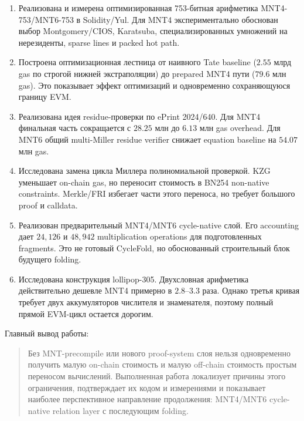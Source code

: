 \documentclass[12pt,a4paper]{article}
\begin{document}
\begin{enumerate}
    \item Реализована и измерена оптимизированная 753-битная арифметика
    MNT4-753/MNT6-753 в Solidity/Yul. Для MNT4 экспериментально обоснован выбор
    Montgomery/CIOS, Karatsuba, специализированных умножений на нерезиденты,
    sparse lines и packed hot path.

    \item Построена оптимизационная лестница от наивного Tate baseline
    ($2.55$ млрд gas по строгой нижней экстраполяции) до prepared MNT4 пути
    ($79.6$ млн gas). Это показывает эффект оптимизаций и одновременно
    сохраняющуюся границу EVM.

    \item Реализована идея residue-проверки по ePrint 2024/640. Для MNT4
    финальная часть сокращается с $28.25$ млн до $6.13$ млн gas overhead.
    Для MNT6 общий multi-Miller residue verifier снижает equation baseline на
    $54.07$ млн gas.

    \item Исследована замена цикла Миллера полиномиальной проверкой. KZG
    уменьшает on-chain gas, но переносит стоимость в BN254 non-native
    constraints. Merkle/FRI избегает части этого переноса, но требует большого
    proof и calldata.

    \item Реализован предварительный MNT4/MNT6 cycle-native слой. Его
    accounting дает $24{,}126$ и $48{,}942$ multiplication operations для
    подготовленных fragments. Это не готовый CycleFold, но обоснованный
    строительный блок будущего folding.

    \item Исследована конструкция lollipop-305. Двухсловная арифметика
    действительно дешевле MNT4 примерно в $2.8$--$3.3$ раза. Однако третья
    кривая требует двух аккумуляторов числителя и знаменателя, поэтому полный
    прямой EVM-цикл остается дорогим.
\end{enumerate}

Главный вывод работы:
\begin{quote}
Без MNT-precompile или нового proof-system слоя нельзя одновременно получить
малую on-chain стоимость и малую off-chain стоимость простым переносом
вычислений. Выполненная работа локализует причины этого ограничения,
подтверждает их кодом и измерениями и показывает наиболее перспективное
направление продолжения: MNT4/MNT6 cycle-native relation layer с последующим
folding.
\end{quote}
\end{document}
